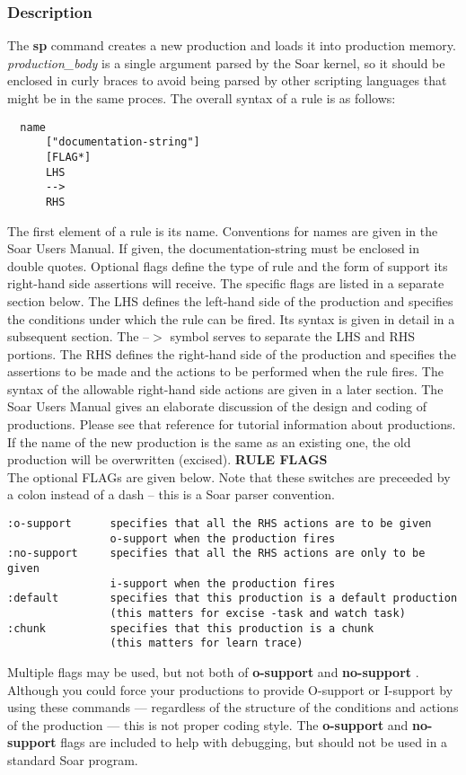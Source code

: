 \subsubsection*{Description}
 The \textbf{sp}
 command creates a new production and loads it into production memory. \emph{production\_body}
 is a single argument parsed by the Soar kernel, so it should be enclosed in curly braces to avoid being parsed by other scripting languages that might be in the same proces. The overall syntax of a rule is as follows: \begin{verbatim}
  name 
      ["documentation-string"] 
      [FLAG*]
      LHS
      -->
      RHS
\end{verbatim}
 The first element of a rule is its name. Conventions for names are given in the Soar Users Manual. If given, the documentation-string must be enclosed in double quotes. Optional flags define the type of rule and the form of support its right-hand side assertions will receive. The specific flags are listed in a separate section below. The LHS defines the left-hand side of the production and specifies the conditions under which the rule can be fired. Its syntax is given in detail in a subsequent section. The --$>$ symbol serves to separate the LHS and RHS portions. The RHS defines the right-hand side of the production and specifies the assertions to be made and the actions to be performed when the rule fires. The syntax of the allowable right-hand side actions are given in a later section. The Soar Users Manual gives an elaborate discussion of the design and coding of productions. Please see that reference for tutorial information about productions. 
 If the name of the new production is the same as an existing one, the old production will be overwritten (excised). 
 \textbf{RULE FLAGS}
\\ 
 The optional FLAGs are given below. Note that these switches are preceeded by a colon instead of a dash -- this is a Soar parser convention. \begin{verbatim}
:o-support      specifies that all the RHS actions are to be given
                o-support when the production fires 
:no-support     specifies that all the RHS actions are only to be given
                i-support when the production fires 
:default        specifies that this production is a default production 
                (this matters for excise -task and watch task) 
:chunk          specifies that this production is a chunk 
                (this matters for learn trace)
\end{verbatim}
 Multiple flags may be used, but not both of \textbf{o-support}
 and \textbf{no-support}
. 
 Although you could force your productions to provide O-support or I-support by using these commands --- regardless of the structure of the conditions and actions of the production --- this is not proper coding style. The \textbf{o-support}
 and \textbf{no-support}
 flags are included to help with debugging, but should not be used in a standard Soar program. 
